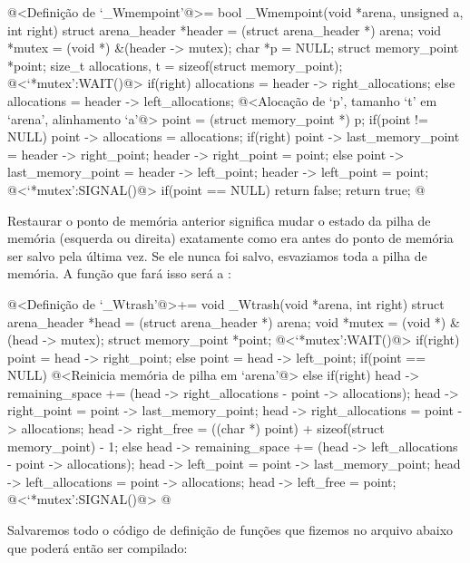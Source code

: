 \iniciocodigo
@<Definição de `\_Wmempoint'@>=
bool _Wmempoint(void *arena, unsigned a, int right){
  struct arena_header *header = (struct arena_header *) arena;
  void *mutex = (void *) &(header -> mutex);
  char *p = NULL;
  struct memory_point *point;
  size_t allocations, t = sizeof(struct memory_point);
  @<`*mutex':WAIT()@>
  if(right)
    allocations = header -> right_allocations;
  else
    allocations = header -> left_allocations;
  @<Alocação de `p', tamanho `t' em `arena', alinhamento `a'@>
  point = (struct memory_point *) p;
  if(point != NULL){
    point -> allocations = allocations;
    if(right){
      point -> last_memory_point = header -> right_point;
      header -> right_point = point;
    }
    else{
      point -> last_memory_point = header -> left_point;
      header -> left_point = point;
    }
  }
  @<`*mutex':SIGNAL()@>
  if(point == NULL)
    return false;
  return true;
}
@
\fimcodigo


Restaurar o ponto de memória anterior significa mudar o estado da
pilha de memória (esquerda ou direita) exatamente como era antes do
ponto de memória ser salvo pela última vez. Se ele nunca foi salvo,
esvaziamos toda a pilha de memória. A função que fará isso será
a :

\iniciocodigo
@<Definição de `\_Wtrash'@>+=
void _Wtrash(void *arena, int right){
  struct arena_header *head = (struct arena_header *) arena;
  void *mutex = (void *) &(head -> mutex);
  struct memory_point *point;
  @<`*mutex':WAIT()@>
  if(right){
    point = head -> right_point;
  }
  else{
    point = head -> left_point;
  }
  if(point == NULL){
    @<Reinicia memória de pilha em `arena'@>
  }
  else{
    if(right){
      head -> remaining_space += (head -> right_allocations -
                                  point -> allocations);
      head -> right_point = point -> last_memory_point;
      head -> right_allocations = point -> allocations;
      head -> right_free = ((char *) point) + sizeof(struct memory_point) - 1;
    }
    else{
      head -> remaining_space += (head -> left_allocations -
                                  point -> allocations);
      head -> left_point = point -> last_memory_point;
      head -> left_allocations = point -> allocations;
      head -> left_free = point;
    }
  }
  @<`*mutex':SIGNAL()@>
}
@
\fimcodigo



Salvaremos todo o código de definição de funções que fizemos no
arquivo abaixo que poderá então ser compilado:

